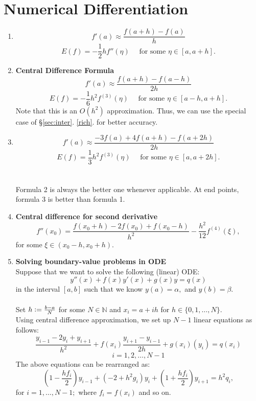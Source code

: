 \documentclass[12pt]{article}
\theoremstyle{definition}
\begin{document}
\section{Numerical Differentiation}
\begin{enumerate} 
	\itemsep1em
	\item \[f'(a) \approx \frac{f(a + h) - f(a)}{h}\]
	\[E(f) = -\frac{1}{2}hf''(\eta) \quad \text{ for some }\eta\in[a, a+h].\]
	\item \textbf{Central Difference Formula}\\
	\[f'(a) \approx \frac{f(a + h) - f(a-h)}{2h}\]
	\[E(f) = -\frac{1}{6}h^2f^{(3)}(\eta) \quad \text{ for some }\eta\in[a-h, a+h].\]
	Note that this is an $O(h^2)$ approximation. Thus, we can use the special case of \S\ref{sec:inter}. \ref{rich}. for better accuracy.
	\item \[f'(a) \approx \frac{-3f(a) + 4f(a + h) - f(a + 2h)}{2h}\]
	\[E(f) = \frac{1}{3}h^2f^{(3)}(\eta) \quad \text{ for some }\eta\in[a, a+2h].\]\\
	\\
	Formula 2 is always the better one whenever applicable. At end points, formula 3 is better than formula 1.
	\item \textbf{Central difference for second derivative}\\
	\[f''(x_0) = \frac{f(x_0 + h) - 2f(x_0) + f(x_0 - h)}{h^2} - \frac{h^2}{12}f^{(4)}(\xi),\]
	for some $\xi \in (x_0 - h, x_0 + h).$
	\item \textbf{Solving boundary-value problems in ODE}\\
	Suppose that we want to solve the following (linear) ODE:
	\[y''(x) + f(x)y'(x) + g(x)y = q(x)\]
	in the interval $[a, b]$ such that we know $y(a) = \alpha,$ and $y(b) = \beta.$ \\~\\
	Set $h \vcentcolon= \frac{b - a}{N}$ for some $N \in \mathbb{N}$ and $x_i = a + ih$ for $h \in \{0, 1, \ldots, N\}.$\\
	Using central difference approximation, we set up $N-1$ linear equations as follows:
	\[\frac{y_{i-1} - 2y_i + y_{i+1}}{h^2} + f(x_i)\frac{y_{i+1} - y_{i-1}}{2h} + g(x_i)(y_i) = q(x_i)\]
	\[i = 1, 2, \ldots, N-1\]
	The above equations can be rearranged as:
	\[\left(1 - \frac{hf_i}{2}\right)y_{i-1} + (-2 + h^2g_i)y_i + \left(1 + \frac{hf_i}{2}\right)y_{i+1} = h^2q_i,\]
	for $i = 1, \ldots, N-1;$ where $f_i = f(x_i)$ and so on.\\
\end{enumerate}
\end{document}
